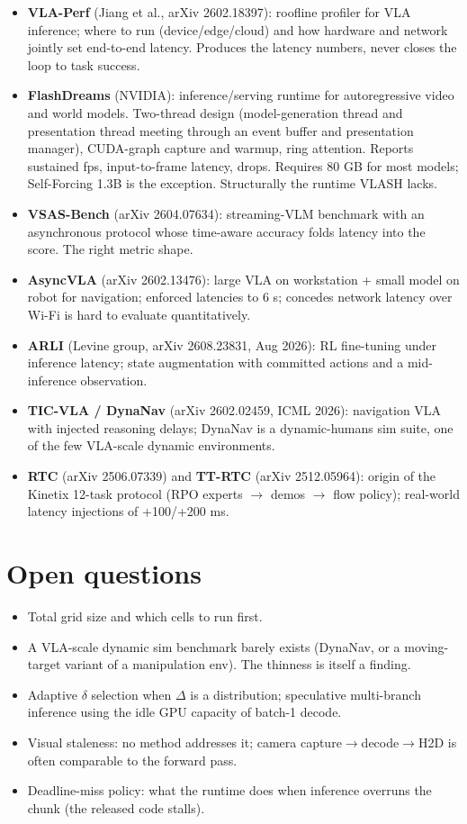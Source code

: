 \documentclass[10pt,letterpaper]{article}
\begin{document}
\begin{itemize}
\item \textbf{VLA-Perf} (Jiang et al., arXiv 2602.18397): roofline profiler for VLA inference; where to run (device/edge/cloud) and how hardware and network jointly set end-to-end latency. Produces the latency numbers, never closes the loop to task success.
\item \textbf{FlashDreams} (NVIDIA): inference/serving runtime for autoregressive video and world models. Two-thread design (model-generation thread and presentation thread meeting through an event buffer and presentation manager), CUDA-graph capture and warmup, ring attention. Reports sustained fps, input-to-frame latency, drops. Requires 80 GB for most models; Self-Forcing 1.3B is the exception. Structurally the runtime VLASH lacks.
\item \textbf{VSAS-Bench} (arXiv 2604.07634): streaming-VLM benchmark with an asynchronous protocol whose time-aware accuracy folds latency into the score. The right metric shape.
\item \textbf{AsyncVLA} (arXiv 2602.13476): large VLA on workstation + small model on robot for navigation; enforced latencies to 6 s; concedes network latency over Wi-Fi is hard to evaluate quantitatively.
\item \textbf{ARLI} (Levine group, arXiv 2608.23831, Aug 2026): RL fine-tuning under inference latency; state augmentation with committed actions and a mid-inference observation.
\item \textbf{TIC-VLA / DynaNav} (arXiv 2602.02459, ICML 2026): navigation VLA with injected reasoning delays; DynaNav is a dynamic-humans sim suite, one of the few VLA-scale dynamic environments.
\item \textbf{RTC} (arXiv 2506.07339) and \textbf{TT-RTC} (arXiv 2512.05964): origin of the Kinetix 12-task protocol (RPO experts $\to$ demos $\to$ flow policy); real-world latency injections of +100/+200 ms.
\end{itemize}

\section{Open questions}

\begin{itemize}
\item Total grid size and which cells to run first.
\item A VLA-scale dynamic sim benchmark barely exists (DynaNav, or a moving-target variant of a manipulation env). The thinness is itself a finding.
\item Adaptive $\delta$ selection when $\Delta$ is a distribution; speculative multi-branch inference using the idle GPU capacity of batch-1 decode.
\item Visual staleness: no method addresses it; camera capture$\to$decode$\to$H2D is often comparable to the forward pass.
\item Deadline-miss policy: what the runtime does when inference overruns the chunk (the released code stalls).
\end{itemize}
\end{document}
